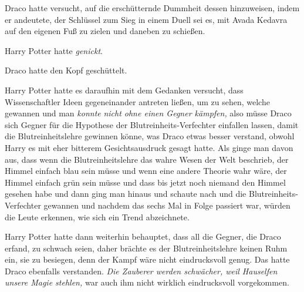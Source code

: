Draco hatte versucht, auf die erschütternde Dummheit dessen hinzuweisen, indem er andeutete, der Schlüssel zum Sieg in einem Duell sei es, mit Avada Kedavra auf den eigenen Fuß zu zielen und daneben zu schießen.

Harry Potter hatte \emph{genickt}.

Draco hatte den Kopf geschüttelt.

Harry Potter hatte es daraufhin mit dem Gedanken versucht, dass Wissenschaftler Ideen gegeneinander antreten ließen, um zu sehen, welche gewannen und man \emph{konnte} \emph{nicht ohne einen Gegner kämpfen,} also müsse Draco sich Gegner für die Hypothese der Blutreinheits-Verfechter einfallen lassen, damit die Blutreinheitslehre gewinnen könne, was Draco etwas besser verstand, obwohl Harry es mit eher bitterem Gesichtsausdruck gesagt hatte. Als ginge man davon aus, dass wenn die Blutreinheitslehre das wahre Wesen der Welt beschrieb, der Himmel einfach blau sein müsse und wenn eine andere Theorie wahr wäre, der Himmel einfach grün sein müsse und dass bis jetzt noch niemand den Himmel gesehen habe und dann ging man hinaus und schaute nach und die Blutreinheits-Verfechter gewannen und nachdem das sechs Mal in Folge passiert war, würden die Leute erkennen, wie sich ein Trend abzeichnete.

Harry Potter hatte dann weiterhin behauptet, dass all die Gegner, die Draco erfand, zu schwach seien, daher brächte es der Blutreinheitslehre keinen Ruhm ein, sie zu besiegen, denn der Kampf wäre nicht eindrucksvoll genug. Das hatte Draco ebenfalls verstanden. \emph{Die Zauberer werden schwächer, weil Hauselfen unsere Magie stehlen,} war auch ihm nicht wirklich eindrucksvoll vorgekommen.

